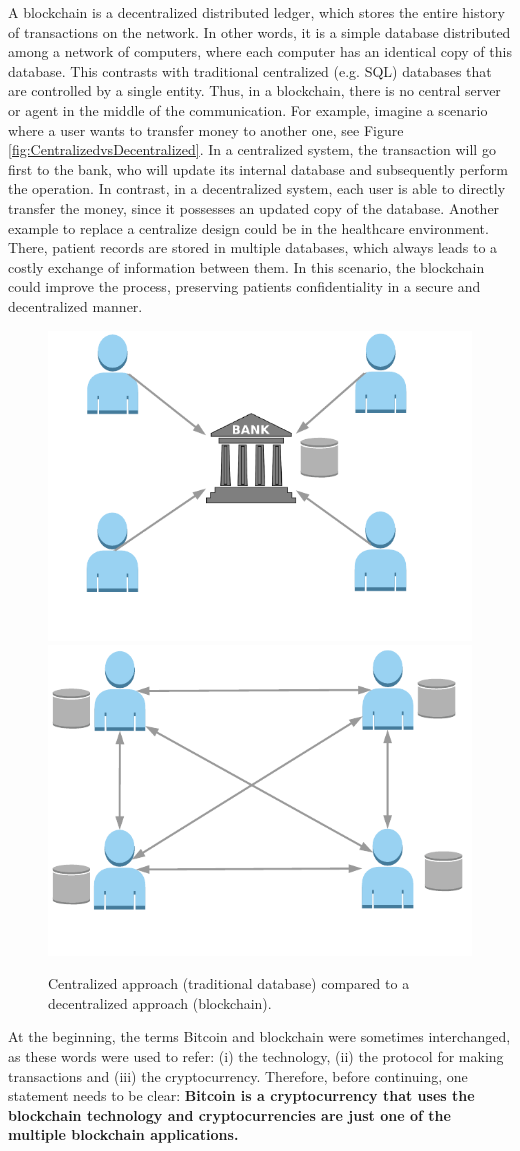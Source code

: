 A blockchain is a decentralized distributed ledger, which stores the entire history of transactions on the network. In other words, it is a simple database distributed among a network of computers, where each computer has an identical copy of this database. This contrasts with traditional centralized (e.g. SQL) databases that are controlled by a single entity. Thus, in a blockchain, there is no central server or agent in the middle of the communication. For example, imagine a scenario where a user wants to transfer money to another one, see Figure \ref{fig:CentralizedvsDecentralized}. In a centralized system, the transaction will go first to the bank, who will update its internal database and subsequently perform the operation. In contrast, in a decentralized system, each user is able to directly transfer the money, since it possesses an updated copy of the database. Another example to replace a centralize design could be in the healthcare environment. There, patient records are stored in multiple databases, which always leads to a costly exchange of information between them. In this scenario, the blockchain could improve the process, preserving patients confidentiality in a secure and decentralized manner.

\begin{figure}[bth]
	\myfloatalign
	{\includegraphics[width=0.4\linewidth]{gfx/cenVsDec}} \quad
	{\includegraphics[width=0.4\linewidth]{gfx/cenVsDec2}} \\
	\caption{Centralized approach (traditional database) compared to a decentralized approach (blockchain).}
	\label{fig:CentralizedvsDecentralizedx}
\end{figure}
At the beginning, the terms Bitcoin and blockchain were sometimes interchanged, as these words were used to refer: (i) the technology, (ii) the protocol for making transactions and (iii) the cryptocurrency. Therefore, before continuing, one statement needs to be clear: \textbf{Bitcoin is a cryptocurrency that uses the blockchain technology and cryptocurrencies are just one of the multiple blockchain applications.} 

